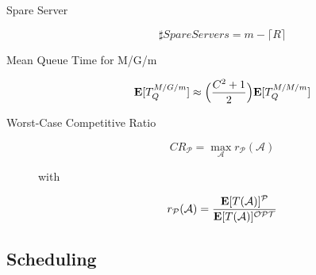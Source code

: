 \begin{description}
	
	\item [Spare Server]
		\begin{equation}
		\sharp SpareServers=m-\lceil R\rceil
		\end{equation}
	
	\item [Mean Queue Time for M/G/m]
		\begin{equation}
		\mathbf{E}[T_{Q}^{M/G/m}]\approx\Big(\frac{C^{2}+1}{2}\Big)\mathbf{E}[T_{Q}^{M/M/m}]
		\end{equation}
		
	\item [Worst-Case Competitive Ratio]
		\begin{equation}
		CR_{\mathcal{P}}=\max_{\mathcal{A}}r_{\mathcal{P}}(\mathcal{A})
		\end{equation}
		
		with
		
		\begin{equation}
		r_{\mathcal{P}}(\mathcal{A})=\frac{\mathbf{E}[T(\mathcal{A})]^{\mathcal{P}}}{\mathbf{E}[T(\mathcal{A})]^{\mathcal{OPT}}}
		\end{equation}
		
\end{description}




\subsection{Scheduling}

